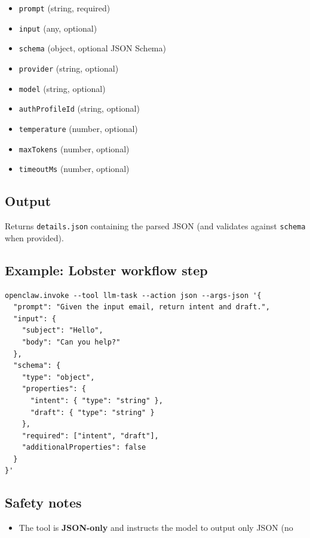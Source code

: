 \begin{itemize}
  \item \texttt{prompt} (string, required)
  \item \texttt{input} (any, optional)
  \item \texttt{schema} (object, optional JSON Schema)
  \item \texttt{provider} (string, optional)
  \item \texttt{model} (string, optional)
  \item \texttt{authProfileId} (string, optional)
  \item \texttt{temperature} (number, optional)
  \item \texttt{maxTokens} (number, optional)
  \item \texttt{timeoutMs} (number, optional)
\end{itemize}


\subsection{Output}


Returns \texttt{details.json} containing the parsed JSON (and validates against
\texttt{schema} when provided).

\subsection{Example: Lobster workflow step}


\begin{lstlisting}
openclaw.invoke --tool llm-task --action json --args-json '{
  "prompt": "Given the input email, return intent and draft.",
  "input": {
    "subject": "Hello",
    "body": "Can you help?"
  },
  "schema": {
    "type": "object",
    "properties": {
      "intent": { "type": "string" },
      "draft": { "type": "string" }
    },
    "required": ["intent", "draft"],
    "additionalProperties": false
  }
}'
\end{lstlisting}


\subsection{Safety notes}


\begin{itemize}
  \item The tool is \textbf{JSON-only} and instructs the model to output only JSON (no
\end{itemize}

